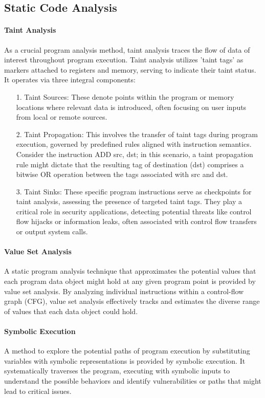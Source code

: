 \subsection{Static Code Analysis}

\paragraph{\textbf{Taint Analysis}} As a crucial program analysis
method, taint analysis traces the flow of data of interest throughout
program execution. Taint analysis utilizes 'taint tags' as markers attached
to registers and memory, serving to indicate their taint status. It
operates via three integral components:

\begin{enumerate}
%
  \item[1.] Taint Sources: These denote points within the program or memory
locations where relevant data is introduced, often focusing on user inputs
from local or remote sources.
%  
  \item[2.] Taint Propagation: This involves the transfer of taint tags
during program execution, governed by predefined rules aligned with
instruction semantics. Consider the instruction ADD src, dst; in this
scenario, a taint propagation rule might dictate that the resulting tag of
destination (dst) comprises a bitwise OR operation between the tags
associated with src and dst.
%  
  \item[3.] Taint Sinks: These specific program instructions serve as
checkpoints for taint analysis, assessing the presence of targeted taint
tags. They play a critical role in security applications, detecting
potential threats like control flow hijacks or information leaks, often
associated with control flow transfers or output system calls.
%  
\end{enumerate}

\paragraph{\textbf{Value Set Analysis}} A static program analysis technique
that approximates the potential values that each program data object might
hold at any given program point is provided by value set analysis. By
analyzing individual instructions within a control-flow graph (CFG), value
set analysis effectively tracks and estimates the diverse range of values
that each data object could hold. 

\paragraph{\textbf{Symbolic Execution}} A method to explore the potential
paths of program execution by substituting variables with symbolic
representations is provided by symbolic execution. It systematically
traverses the program, executing with symbolic inputs to understand the
possible behaviors and identify vulnerabilities or paths that might lead to
critical issues.

